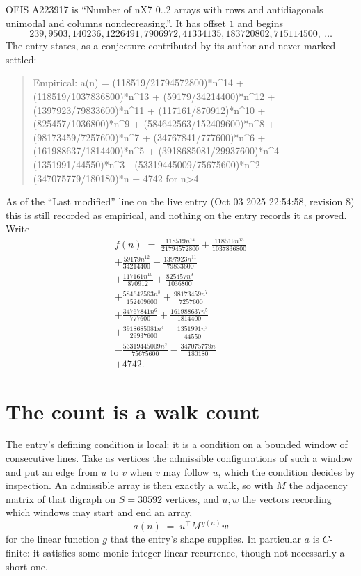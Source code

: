 \documentclass[11pt,a4paper]{article}
\theoremstyle{plain}
\theoremstyle{definition}
\begin{document}
OEIS A223917 is ``Number of nX7 0..2 arrays with rows and antidiagonals unimodal and columns nondecreasing.''. It has offset $1$ and begins
\[
239, 9503, 140236, 1226491, 7906972, 41334135, 183720802, 715114500,\ \dots
\]
The entry states, as a conjecture contributed by its author and never marked settled:
\begin{quote}\raggedright\small
Empirical: a(n) = (118519/21794572800)*n\^{}14 + (118519/1037836800)*n\^{}13 + (59179/34214400)*n\^{}12 + (1397923/79833600)*n\^{}11 + (117161/870912)*n\^{}10 + (825457/1036800)*n\^{}9 + (584642563/152409600)*n\^{}8 + (98173459/7257600)*n\^{}7 + (34767841/777600)*n\^{}6 + (161988637/1814400)*n\^{}5 + (3918685081/29937600)*n\^{}4 - (1351991/44550)*n\^{}3 - (53319445009/75675600)*n\^{}2 - (347075779/180180)*n + 4742 for n>4
\end{quote}
As of the ``Last modified'' line on the live entry (Oct 03 2025 22:54:58, revision 8) this is still
recorded as empirical, and nothing on the entry records it as proved. Write
\begin{multline*}
f(n)\;=\;\frac{118519 n^{14}}{21794572800} + \frac{118519 n^{13}}{1037836800} \\
+ \frac{59179 n^{12}}{34214400} + \frac{1397923 n^{11}}{79833600} \\
+ \frac{117161 n^{10}}{870912} + \frac{825457 n^{9}}{1036800} \\
+ \frac{584642563 n^{8}}{152409600} + \frac{98173459 n^{7}}{7257600} \\
+ \frac{34767841 n^{6}}{777600} + \frac{161988637 n^{5}}{1814400} \\
+ \frac{3918685081 n^{4}}{29937600} - \frac{1351991 n^{3}}{44550} \\
- \frac{53319445009 n^{2}}{75675600} - \frac{347075779 n}{180180} \\
+ 4742.
\end{multline*}

\section{The count is a walk count}

The entry's defining condition is local: it is a condition on a bounded window of consecutive lines. Take as vertices the
admissible configurations of such a window and put an edge from $u$ to $v$ when $v$ may
follow $u$, which the condition decides by inspection. An admissible array is then exactly a
walk, so with $M$ the adjacency matrix of that digraph on $S=30592$ vertices, and $u,w$ the
vectors recording which windows may start and end an array,
\[
a(n)\;=\;u^{\!\top}M^{\,g(n)}w
\]
for the linear function $g$ that the entry's shape supplies. In particular $a$ is
$C$-finite: it satisfies some monic integer linear recurrence, though not necessarily a short
one.
\end{document}
